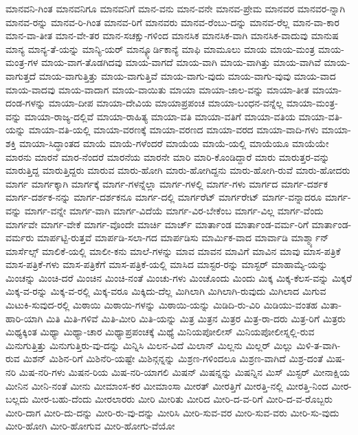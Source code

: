 {ಮಾನವನಿ-ಗಿಂತ
ಮಾನವನಿಗೂ
ಮಾನವನಿಗೆ
ಮಾನ-ವನು
ಮಾನ-ವನೇ
ಮಾನವ-ಪ್ರೇಮ
ಮಾನವರ
ಮಾನವರ-ನ್ನಾಗಿ
ಮಾನವ-ರನ್ನು
ಮಾನವ-ರಿ-ಗಿಂತ
ಮಾನವ-ರಿಗೆ
ಮಾನವರು
ಮಾನವ-ರೆಂಬು-ದನ್ನು
ಮಾನವ-ರೆಲ್ಲ
ಮಾನ-ವಾ-ಕಾರ
ಮಾನ-ವಾ-ತೀತ
ಮಾನ-ವೇ-ತರ
ಮಾನ-ಸಚಕ್ಷು-ಗಳಿಂದ
ಮಾನಸಿಕ
ಮಾನಸಿಕ-ವಾಗಿ
ಮಾನಸಿಕ-ವಾದುವು
ಮಾನುಷ
ಮಾನ್ಯ
ಮಾನ್ಯ-ತೆ-ಯನ್ನು
ಮಾನ್ಯಿ-ಯರ್
ಮಾನ್ಕ್ಯೂರ್ಡಿಕಾನ್ಯೆ
ಮಾಫಿ
ಮಾಮೂಲು
ಮಾಯ
ಮಾಯ-ಮಂತ್ರ
ಮಾಯ-ಮಂತ್ರ-ಗಳ
ಮಾಯ-ವಾಗ-ತೊಡಗಿದವು
ಮಾಯ-ವಾಗದೆ
ಮಾಯ-ವಾಗಿ
ಮಾಯ-ವಾಗಿತ್ತು
ಮಾಯ-ವಾಗಿವೆ
ಮಾಯ-ವಾಗುತ್ತದೆ
ಮಾಯ-ವಾಗುತ್ತಿತ್ತು
ಮಾಯ-ವಾಗುತ್ತಿವೆ
ಮಾಯ-ವಾಗು-ವುದು
ಮಾಯ-ವಾಗು-ವುವು
ಮಾಯ-ವಾದ
ಮಾಯ-ವಾದವು
ಮಾಯ-ವಾದಾಗ
ಮಾಯ-ವಾಯಿತು
ಮಾಯಾ
ಮಾಯಾ-ಜಾಲ-ವನ್ನು
ಮಾಯಾ-ತೀತ
ಮಾಯಾ-ದಂಡ-ಗಳನ್ನು
ಮಾಯಾ-ದೀಪ
ಮಾಯಾ-ದೇವಿಯ
ಮಾಯಾಪ್ರಪಂಚ
ಮಾಯಾ-ಬಂಧನ-ವನ್ನೆಲ್ಲ
ಮಾಯಾ-ಮಂತ್ರ-ವನ್ನು
ಮಾಯಾ-ರಾಜ್ಯ-ದಲ್ಲಿವೆ
ಮಾಯಾ-ರಾಹಿತ್ಯ
ಮಾಯಾ-ವತಿ
ಮಾಯಾ-ವತಿಗೆ
ಮಾಯಾ-ವತಿಯ
ಮಾಯಾ-ವತಿ-ಯನ್ನು
ಮಾಯಾ-ವತಿ-ಯಲ್ಲಿ
ಮಾಯಾ-ವರಣಕ್ಕೆ
ಮಾಯಾ-ವರಣದ
ಮಾಯಾ-ವರದ
ಮಾಯಾ-ವಾದಿ-ಗಳು
ಮಾಯಾ-ಶಕ್ತಿ
ಮಾಯಾ-ಸಿದ್ಧಾಂತದ
ಮಾಯೆ
ಮಾಯೆ-ಗಳೆಂದರೆ
ಮಾಯೆಯ
ಮಾಯೆ-ಯಲ್ಲಿ
ಮಾಯೆಯೂ
ಮಾಯೆಯೇ
ಮಾರನು
ಮಾರನೆ
ಮಾರ-ನೆಂದರೆ
ಮಾರನೆಯ
ಮಾರನೇ
ಮಾರಿ
ಮಾರಿ-ಕೊಂಡಿದ್ದಾರೆ
ಮಾರು
ಮಾರುತ್ತರ-ವನ್ನು
ಮಾರುತ್ತಿದ್ದ
ಮಾರುತ್ತಿದ್ದರು
ಮಾರುವ
ಮಾರು-ಹೋಗಿ
ಮಾರು-ಹೋಗಿದ್ದನು
ಮಾರು-ಹೋಗಿ-ರುವೆ
ಮಾರು-ಹೋದರು
ಮಾರ್ಗ
ಮಾರ್ಗಕ್ಕಾಗಿ
ಮಾರ್ಗಕ್ಕೆ
ಮಾರ್ಗ-ಗಳನ್ನೆಲ್ಲಾ
ಮಾರ್ಗ-ಗಳಲ್ಲಿ
ಮಾರ್ಗ-ಗಳು
ಮಾರ್ಗದ
ಮಾರ್ಗ-ದರ್ಶಕ
ಮಾರ್ಗ-ದರ್ಶಕ-ನನ್ನು
ಮಾರ್ಗ-ದರ್ಶಕನೂ
ಮಾರ್ಗ-ದಲ್ಲಿ
ಮಾರ್ಗರೆಟ್
ಮಾರ್ಗರೇಟ್
ಮಾರ್ಗ-ವನ್ನಾದರೂ
ಮಾರ್ಗ-ವನ್ನು
ಮಾರ್ಗ-ವನ್ನೇ
ಮಾರ್ಗ-ವಾಗಿ
ಮಾರ್ಗ-ವಿದೆಯೆ
ಮಾರ್ಗ-ವಿರ-ಬೇಕೆಂಬ
ಮಾರ್ಗ-ವಿಲ್ಲ
ಮಾರ್ಗ-ವೆಂದು
ಮಾರ್ಗವೇ
ಮಾರ್ಗ-ವೇಕೆ
ಮಾರ್ಗ-ವೊಂದೇ
ಮಾರ್ಚಿ
ಮಾರ್ಚ್
ಮಾರ್ತಾಂಡ
ಮಾರ್ತಾಂಡ-ವರ್ಮ-ರಿಗೆ
ಮಾರ್ತಾಂಡ-ವರ್ಮರು
ಮಾರ್ಪಟ್ಟಿ-ರುತ್ತವೆ
ಮಾರ್ಪಡಿ-ಸಲಾ-ಗದ
ಮಾರ್ಪಡಿಸು
ಮಾರ್ಮಿಕ-ವಾದ
ಮಾರ್ವಾಡಿ
ಮಾರ್ಶ್ಮ್ಯಾನ್
ಮಾರ್ಸೆಲ್ಸ್
ಮಾಲಿಕೆ-ಯಲ್ಲಿ
ಮಾಲೀ-ಕನು
ಮಾಲೆ-ಗಳನ್ನು
ಮಾವ
ಮಾವನ
ಮಾವಿಗೆ
ಮಾವಿನ
ಮಾವು
ಮಾಸ-ಪತ್ರಿಕೆ
ಮಾಸ-ಪತ್ರಿಕೆ-ಗಳು
ಮಾಸ-ಪತ್ರಿಕೆಗೆ
ಮಾಸ-ಪತ್ರಿಕೆ-ಯಲ್ಲಿ
ಮಾಸಿದ
ಮಾಸ್ಟರ-ರನ್ನು
ಮಾಸ್ಟರ್
ಮಾಹಾಮ್ಯೆ-ಯನ್ನು
ಮಿಂಚನ್ನು
ಮಿಂಚಿ-ದರೆ
ಮಿಂಚಿನ
ಮಿಂಚಿ-ನಂತೆ
ಮಿಂಚು-ಗಳು
ಮಿಂಚೊಂದು
ಮಿಂದು
ಮಿಕ್ಕ
ಮಿಕ್ಕ-ಕೆಲಸ-ವನ್ನು
ಮಿಕ್ಕರೆ
ಮಿಕ್ಕ-ವ-ರನ್ನು
ಮಿಕ್ಕ-ವ-ರಲ್ಲಿ
ಮಿಕ್ಕ-ವರೂ
ಮಿಕ್ಕಿದು-ದೆಲ್ಲ
ಮಿಗಿಲಾಗಿ
ಮಿಗಿಲಾಗಿ-ರುವುದು
ಮಿಗಿಲಾದ
ಮಿಗುವ
ಮಿಟುಕಿ-ಸುವುದ-ರಲ್ಲಿ
ಮಿಠಾಯಿ
ಮಿಠಾಯಿ-ಗಳನ್ನು
ಮಿಠಾಯಿ-ಯನ್ನು
ಮಿಡಿದಿ-ರು-ವಿರಿ
ಮಿಡಿಯು-ವಂತಹ
ಮಿತಾ-ಹಾರಿ-ಯಾಗಿ
ಮಿತಿ
ಮಿತಿ-ಗಳಿವೆ
ಮಿತಿ-ಮೀರಿ
ಮಿತಿ-ಯನ್ನು
ಮಿತ್ರ
ಮಿತ್ರನ
ಮಿತ್ರರ
ಮಿತ್ರ-ರಾ-ದರು
ಮಿತ್ರ-ರಿಗೆ
ಮಿತ್ರರು
ಮಿಥ್ಯಕ್ಕಿಂತ
ಮಿಥ್ಯಾ
ಮಿಥ್ಯಾ-ಚಾರ
ಮಿಥ್ಯಾಪ್ರಪಂಚಕ್ಕೆ
ಮಿಥ್ಯೆ
ಮಿನಿಯಪೋಲೀಸ್
ಮಿನಿಯಪೋಲೀಸ್ನಲ್ಲಿ-ರುವ
ಮಿನುಗುತ್ತಿತ್ತು
ಮಿನುಗುತ್ತಿರು-ವು-ದನ್ನು
ಮಿನ್ನಿಸಿ
ಮಿಲನ-ವಿದೆ
ಮಿಲಾನ್
ಮಿಲ್ಲನು
ಮಿಲ್ಲರ್
ಮಿಲ್ಲು
ಮಿಳಿ-ತ-ವಾಗಿ-ರುವ
ಮಿಶನ್
ಮಿಶಿನ-ರಿಗೆ
ಮಿಶಿನೆರಿ-ಯಷ್ಟೇ
ಮಿಶಿನ್ಗನ್ನನ್ನು
ಮಿಶ್ರಣ-ಗಳಿಂದಲೂ
ಮಿಶ್ರಣ-ವಾಗಿದೆ
ಮಿಶ್ರ-ದಂತೆ
ಮಿಷ-ನರಿ
ಮಿಷ-ನರಿ-ಗಳು
ಮಿಷನ-ರಿಯ
ಮಿಷ-ನರಿ-ಯಾಗಲಿ
ಮಿಷನ್
ಮಿಷನ್ನನ್ನು
ಮಿಷನ್ನಿನ
ಮಿಸ್
ಮಿಸ್ಟರ್
ಮೀನಾಕ್ಷಿಯ
ಮೀನಿನ
ಮೀನಿ-ನಂತೆ
ಮೀನು
ಮೀಮಾಂಸ-ಕರ
ಮೀಮಾಂಸಾ
ಮೀರತ್
ಮೀರತ್ತಿಗೆ
ಮೀರತ್ತಿ-ನಲ್ಲಿ
ಮೀರತ್ತಿ-ನಿಂದ
ಮೀರ-ಬಲ್ಲದು
ಮೀರ-ಬಹು-ದೆಂದು
ಮೀರಲಾರರು
ಮೀರಿ
ಮೀರಿತು
ಮೀರಿದ
ಮೀರಿ-ದ-ವ-ರಿಗೆ
ಮೀರಿ-ದ-ವ-ರೊಬ್ಬರು
ಮೀರಿ-ದಾಗ
ಮೀರಿ-ದು-ದನ್ನು
ಮೀರಿ-ರು-ವು-ದನ್ನು
ಮೀರಿಸಿ
ಮೀರಿ-ಸುವ-ವರ
ಮೀರಿ-ಸುವ-ವರು
ಮೀರಿ-ಸು-ವುದು
ಮೀರಿ-ಹೋಗಿ
ಮೀರಿ-ಹೋಗುವ
ಮೀರಿ-ಹೋಗು-ವೆಯೋ
}
